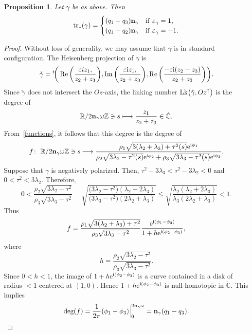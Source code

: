 \documentclass[pdftex]{sigma}
\numberwithin{equation}{section}
\newtheorem{Proposition}[Theorem]{Proposition}
 { \theoremstyle{definition}
\newtheorem{Definition}[Theorem]{Definition}
\newtheorem{Note}[Theorem]{Note}
\newtheorem{Example}[Theorem]{Example}
\newtheorem{Remark}[Theorem]{Remark} }
\def\C{\mathbb{C}}
\def\R{\mathbb{R}}
\def\Z{\mathbb{Z}}
\begin{document}
\begin{Proposition}
Let $\gamma$ be as above. Then
\[{\rm tr}_*(\gamma)=\begin{cases} (q_1-q_3){\bf n}_{\gamma} & {\rm if}\ \varepsilon_{\gamma}=1,\\
(q_1-q_2){\bf n}_{\gamma} & {\rm if}\ \varepsilon_{\gamma}=-1.
\end{cases}
\]
\end{Proposition}

\begin{proof}
Without loss of generality, we may assume that $\gamma$ is in standard configuration.
The Heisenberg projection of $\gamma$ is
\[
 \check{\gamma}={^t\!}\bigg(\operatorname{Re}\bigg(\frac{\varepsilon iz_1,}{z_2+z_3}\bigg),
 {\operatorname{Im}\bigg(\frac{\varepsilon {\rm i}z_1,}{z_2+z_3}\bigg)}, \operatorname{Re}\bigg(\frac{-\varepsilon {\rm i}(z_2-z_3)}{z_2+z_3}\bigg) \bigg).
\]
Since $\check{\gamma}$ does not intersect the $Oz$-axis, the linking number
${\rm Lk}\big(\check{\gamma},Oz^{\uparrow}\big)$ is the degree of
\[
 \R/2{\bf n}_{\gamma}\omega \Z \ni s \longmapsto \frac{z_1}{z_2+z_3}\in \dot{\C}.
\]
From~\eqref{functions}, it follows that this degree is the degree of
\[
 f\colon \ \R/2{\bf n}_{\gamma}\omega \Z\ni s\longmapsto
 \frac{\rho_1\sqrt{3(\lambda_2 + \lambda_3)+\tau^2(s)} {\rm e}^{{\rm i}\phi_1}}{\rho_2\sqrt{3\lambda_2-\tau^2(s)} {\rm e}^{{\rm i}\phi_2}+ \rho_3\sqrt{3\lambda_3-\tau^2(s)} {\rm e}^{{\rm i} \phi_3}}.
\]
Suppose that $\gamma$ is
negatively
polarized. Then, $\tau^2-3\lambda_3<\tau^2-3\lambda_2<0$ and $0<\tau^2<3\lambda_2$. Therefore,
\[
 0<\frac{\rho_2\sqrt{3\lambda_2-\tau^2}}{\rho_3\sqrt{3\lambda_3-\tau^2}}=
\sqrt{\frac{\big(3\lambda_2-\tau^2\big)(\lambda_2+2\lambda_3)}{\big(3\lambda_3-\tau^2\big)(2\lambda_2+\lambda_3)}}
\le \sqrt{\frac{\lambda_2(\lambda_2+2\lambda_3)}{\lambda_3(2\lambda_2+\lambda_3)}}<1.
\]
Thus
\[
 f= \frac{\rho_1\sqrt{3(\lambda_2 + \lambda_3)+\tau^2}}{\rho_3\sqrt{3\lambda_3-\tau^2}}
 \frac{{\rm e}^{{\rm i}(\phi_1-\phi_3)}}{1+h {\rm e}^{{\rm i}(\phi_2-\phi_3)}},
\]
where
\[
 h = \frac{\rho_2\sqrt{3\lambda_2-\tau^2}}{\rho_3\sqrt{3\lambda_3-\tau^2}}.
\]
Since $0<h<1$, the image of $1+h{\rm e}^{{\rm i}(\phi_2-\phi_3)}$
is a curve contained in a disk of radius $<1$ centered at $(1,0)$. Hence $1+h{\rm e}^{{\rm i}(\phi_2-\phi_3)}$ is null-homotopic in $\dot{\C}$. This implies
\[
 \deg (f)=\frac{1}{2\pi}(\phi_1-\phi_3)\Big|_0^{2{\bf n}_{\gamma}\omega} = {\bf n}_{\gamma}(q_1-q_3).
\]


\end{proof}
\end{document}
